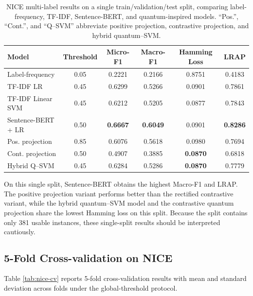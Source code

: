 \documentclass[runningheads]{llncs}
\begin{document}
\begin{table}[htbp]
\centering
\small
\caption{NICE multi-label results on a single train/validation/test split,
comparing label-frequency, TF-IDF, Sentence-BERT, and quantum-inspired models.
``Pos.'', ``Cont.'', and ``Q--SVM'' abbreviate positive projection,
contrastive projection, and hybrid quantum--SVM.}
\label{tab:nice-single}
\setlength{\tabcolsep}{3pt}
\begin{tabular}{@{}lccccc@{}}
\toprule
Model & Threshold & Micro-F1 & Macro-F1 & Hamming Loss & LRAP \\
\midrule
Label-frequency & 0.05 & 0.2221 & 0.2166 & 0.8751 & 0.4183 \\
TF-IDF LR & 0.45 & 0.6299 & 0.5266 & 0.0901 & 0.7861 \\
TF-IDF Linear SVM & 0.45 & 0.6212 & 0.5205 & 0.0877 & 0.7843 \\
Sentence-BERT + LR & 0.50 & \textbf{0.6667} & \textbf{0.6049} & 0.0901 & \textbf{0.8286} \\
Pos. projection & 0.85 & 0.6076 & 0.5618 & 0.0980 & 0.7694 \\
Cont. projection & 0.50 & 0.4907 & 0.3885 & \textbf{0.0870} & 0.6818 \\
Hybrid Q--SVM & 0.45 & 0.6284 & 0.5286 & \textbf{0.0870} & 0.7779 \\
\bottomrule
\end{tabular}
\end{table}

On this single split, Sentence-BERT obtains the highest Macro-F1 and LRAP. The
positive projection variant performs better than the rectified contrastive
variant, while the hybrid quantum--SVM model and the contrastive quantum
projection share the lowest Hamming loss on this split.
Because the split contains only 381 usable instances, these single-split
results should be interpreted cautiously.

\subsection{5-Fold Cross-validation on NICE}
Table \ref{tab:nice-cv} reports 5-fold cross-validation results with mean and
standard deviation across folds under the global-threshold protocol.
\end{document}
